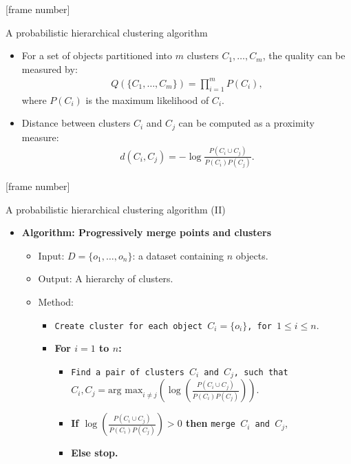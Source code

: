 \documentclass[aspectratio=169,t,xcolor=dvipsnames]{beamer}
\begin{document}
  {
    [frame number]
    \begin{frame}{A probabilistic hierarchical clustering algorithm}
      \centering
      \begin{itemize}
        \item For a set of objects partitioned into $m$ clusters $C_1, \ldots, C_m$,
              the quality can be measured by:
              \begin{align}
                Q(\{C_1, \ldots, C_m\}) = \prod_{i=1}^{m} P(C_i),
              \end{align}
              where $P(C_i)$ is the maximum likelihood of $C_i$.
        \item Distance between clusters $C_i$ and $C_j$ can be computed as a proximity measure:
              \begin{align}
                d(C_i,C_j) = - \log \frac{P(C_i \cup C_j)}{P(C_i)P(C_j)}.
              \end{align}
      \end{itemize}
    \end{frame}
  }

  {
    [frame number]
    \begin{frame}{A probabilistic hierarchical clustering algorithm (II)}
      \centering
      \begin{itemize}
        \item \textbf{Algorithm: Progressively merge points and clusters}
        \begin{itemize}
          \item Input: $D = \{o_1, \ldots, o_n\}$: a dataset containing $n$ objects.
          \item Output: A hierarchy of clusters.
          \item Method:
          \begin{itemize}
            \item \texttt{Create cluster for each object $C_i = \{o_i\}$, for $1 \leq i \leq n$}.
            \item \textbf{For $i=1$ to $n$:}
            \begin{itemize}
              \item \texttt{Find a pair of clusters $C_i$ and $C_j$, such that}\\
                    $C_i, C_j = \text{arg max}_{i \neq j} \left( \log\left( \frac{P(C_i \cup C_j)}{P(C_i)P(C_j)} \right) \right)$.
                    \item \textbf{If $\log\left( \frac{P(C_i \cup C_j)}{P(C_i)P(C_j)}\right) > 0$ then} \texttt{merge $C_i$ and $C_j$},
                    \item \textbf{Else stop.}
            \end{itemize}
          \end{itemize}
        \end{itemize}
      \end{itemize}
    \end{frame}
  }
\end{document}

